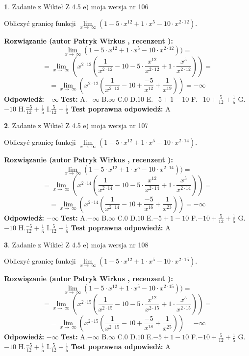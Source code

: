 \documentclass[12pt, a4paper]{article}
\theoremstyle{definition} %
\newtheorem{zad}{}
\newcommand{\zadStart}[1]{\begin{zad}#1\newline}
\newcommand{\zadStop}{\end{zad}}
\newcommand{\rozwStart}[2]{\noindent \textbf{Rozwiązanie (autor #1 , recenzent #2): }\newline}
\newcommand{\rozwStop}{\newline}
\newcommand{\odpStart}{\noindent \textbf{Odpowiedź:}\newline}
\newcommand{\odpStop}{\newline}
\newcommand{\testStart}{\noindent \textbf{Test:}\newline}
\newcommand{\testStop}{\newline}
\newcommand{\kluczStart}{\noindent \textbf{Test poprawna odpowiedź:}\newline}
\newcommand{\kluczStop}{\newline}
\begin{document}
\zadStart{Zadanie z Wikieł Z 4.5 e) moja wersja nr 106}



Obliczyć granicę funkcji  $\lim\limits_{x\to\ \infty}(1 - 5 \cdot x^{12}+1 \cdot x^{5}- 10 \cdot x^{2\cdot12})$.
\zadStop
\rozwStart{Patryk Wirkus}{}
$$\lim\limits_{x\to\ \infty}(1 - 5 \cdot x^{12}+1 \cdot x^{5}- 10 \cdot x^{2\cdot12}))=$$
$$=\lim\limits_{x\to\ \infty}(x^{2\cdot12}(\frac{1}{x^{2\cdot12}}-10 -5 \cdot \frac{x^{12}}{x^{2\cdot12}}+1 \cdot \frac{x^{5}}{x^{2\cdot12}}))=$$
$$=\lim\limits_{x\to\ \infty}(x^{2\cdot12}(\frac{1}{x^{2\cdot12}}-10 + \frac{-5}{x^{12}}+ \frac{1}{x^{19}}))=-\infty$$
\rozwStop
\odpStart
$-\infty$
\odpStop
\testStart
A.$-\infty$ B.$\infty$ C.$0$ D.$10$ E.$-5 + 1 - 10$
F.$-10+\frac{5}{12}+\frac{1}{5}$ G.$-10$
H.$\frac{-5}{12}+\frac{1}{5}$
I.$\frac{5}{12}+\frac{1}{5}$
\testStop
\kluczStart
A
\kluczStop



\zadStart{Zadanie z Wikieł Z 4.5 e) moja wersja nr 107}



Obliczyć granicę funkcji  $\lim\limits_{x\to\ \infty}(1 - 5 \cdot x^{12}+1 \cdot x^{5}- 10 \cdot x^{2\cdot14})$.
\zadStop
\rozwStart{Patryk Wirkus}{}
$$\lim\limits_{x\to\ \infty}(1 - 5 \cdot x^{12}+1 \cdot x^{5}- 10 \cdot x^{2\cdot14}))=$$
$$=\lim\limits_{x\to\ \infty}(x^{2\cdot14}(\frac{1}{x^{2\cdot14}}-10 -5 \cdot \frac{x^{12}}{x^{2\cdot14}}+1 \cdot \frac{x^{5}}{x^{2\cdot14}}))=$$
$$=\lim\limits_{x\to\ \infty}(x^{2\cdot14}(\frac{1}{x^{2\cdot14}}-10 + \frac{-5}{x^{16}}+ \frac{1}{x^{23}}))=-\infty$$
\rozwStop
\odpStart
$-\infty$
\odpStop
\testStart
A.$-\infty$ B.$\infty$ C.$0$ D.$10$ E.$-5 + 1 - 10$
F.$-10+\frac{5}{12}+\frac{1}{5}$ G.$-10$
H.$\frac{-5}{12}+\frac{1}{5}$
I.$\frac{5}{12}+\frac{1}{5}$
\testStop
\kluczStart
A
\kluczStop



\zadStart{Zadanie z Wikieł Z 4.5 e) moja wersja nr 108}



Obliczyć granicę funkcji  $\lim\limits_{x\to\ \infty}(1 - 5 \cdot x^{12}+1 \cdot x^{5}- 10 \cdot x^{2\cdot15})$.
\zadStop
\rozwStart{Patryk Wirkus}{}
$$\lim\limits_{x\to\ \infty}(1 - 5 \cdot x^{12}+1 \cdot x^{5}- 10 \cdot x^{2\cdot15}))=$$
$$=\lim\limits_{x\to\ \infty}(x^{2\cdot15}(\frac{1}{x^{2\cdot15}}-10 -5 \cdot \frac{x^{12}}{x^{2\cdot15}}+1 \cdot \frac{x^{5}}{x^{2\cdot15}}))=$$
$$=\lim\limits_{x\to\ \infty}(x^{2\cdot15}(\frac{1}{x^{2\cdot15}}-10 + \frac{-5}{x^{18}}+ \frac{1}{x^{25}}))=-\infty$$
\rozwStop
\odpStart
$-\infty$
\odpStop
\testStart
A.$-\infty$ B.$\infty$ C.$0$ D.$10$ E.$-5 + 1 - 10$
F.$-10+\frac{5}{12}+\frac{1}{5}$ G.$-10$
H.$\frac{-5}{12}+\frac{1}{5}$
I.$\frac{5}{12}+\frac{1}{5}$
\testStop
\kluczStart
A
\kluczStop
\end{document}
